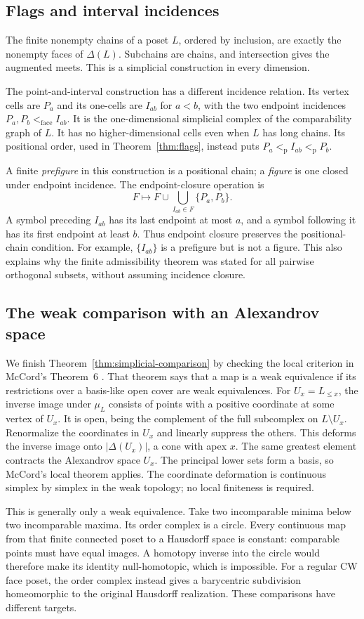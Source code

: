 \subsection{Flags and interval incidences}
The finite nonempty chains of a poset $L$, ordered by inclusion,
are exactly the nonempty faces of $\Delta(L)$. Subchains are
chains, and intersection gives the augmented meets. This is a
simplicial construction in every dimension.

The point-and-interval construction has a different incidence
relation. Its vertex cells are $P_a$ and its one-cells are
$I_{ab}$ for $a<b$, with the two endpoint incidences
$P_a,P_b<_{\mathrm{face}}I_{ab}$. It is the one-dimensional
simplicial complex of the comparability graph of $L$. It has
no higher-dimensional cells even when $L$ has long chains.
Its positional order, used in Theorem~\ref{thm:flags}, instead
puts $P_a<_{\mathrm p}I_{ab}<_{\mathrm p}P_b$.

A finite \emph{prefigure} in this construction is a positional
chain; a \emph{figure} is one closed under endpoint incidence.
The endpoint-closure operation is
\[
 F\longmapsto F\cup\bigcup_{I_{ab}\in F}\{P_a,P_b\}.
\]
A symbol preceding $I_{ab}$ has its last endpoint at most $a$,
and a symbol following it has its first endpoint at least $b$.
Thus endpoint closure preserves the positional-chain condition.
For example, $\{I_{ab}\}$ is a prefigure but is not a figure.
This also explains why the finite admissibility theorem was
stated for all pairwise orthogonal subsets, without assuming
incidence closure.

\subsection{The weak comparison with an Alexandrov space}
We finish Theorem~\ref{thm:simplicial-comparison} by checking the
local criterion in McCord's Theorem~6 \cite[p.~467]{McCord}.
That theorem says that a map is a weak equivalence if its
restrictions over a basis-like open cover are weak equivalences.
For $U_x=L_{\le x}$, the inverse image under $\mu_L$ consists
of points with a positive coordinate at some vertex of $U_x$.
It is open, being the complement of the full subcomplex on
$L\setminus U_x$. Renormalize the coordinates in $U_x$ and
linearly suppress the others. This deforms the inverse image
onto $|\Delta(U_x)|$, a cone with apex $x$. The same greatest
element contracts the Alexandrov space $U_x$. The principal
lower sets form a basis, so McCord's local theorem applies.
The coordinate deformation is continuous simplex by simplex
in the weak topology; no local finiteness is required.

This is generally only a weak equivalence. Take two incomparable
minima below two incomparable maxima. Its order complex is a
circle. Every continuous map from that finite connected poset
to a Hausdorff space is constant: comparable points must have
equal images. A homotopy inverse into the circle would therefore
make its identity null-homotopic, which is impossible.
For a regular CW face poset, the order complex instead gives
a barycentric subdivision homeomorphic to the original
Hausdorff realization. These comparisons have different targets.
